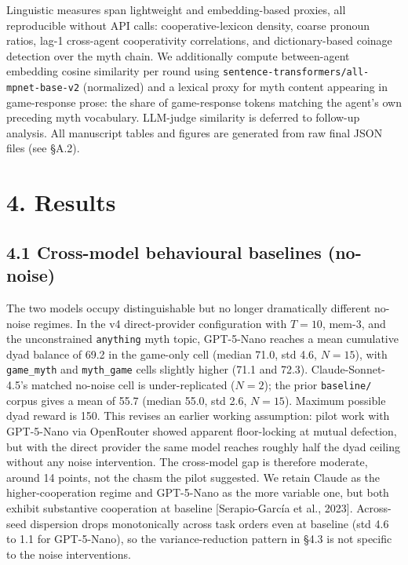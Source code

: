 \documentclass[
  10pt,
  letterpaper,
]{article}
\begin{document}
Linguistic measures span lightweight and embedding-based proxies, all
reproducible without API calls: cooperative-lexicon density, coarse
pronoun ratios, lag-1 cross-agent cooperativity correlations, and
dictionary-based coinage detection over the myth chain. We additionally
compute between-agent embedding cosine similarity per round using
\texttt{sentence-transformers/all-mpnet-base-v2} (normalized) and a
lexical proxy for myth content appearing in game-response prose: the
share of game-response tokens matching the agent's own preceding myth
vocabulary. LLM-judge similarity is deferred to follow-up analysis. All
manuscript tables and figures are generated from raw final JSON files
(see §A.2).

\section{4. Results}\label{results}

\subsection{4.1 Cross-model behavioural baselines
(no-noise)}\label{cross-model-behavioural-baselines-no-noise}

The two models occupy distinguishable but no longer dramatically
different no-noise regimes. In the v4 direct-provider configuration with
\(T = 10\), mem-3, and the unconstrained \texttt{anything} myth topic,
GPT-5-Nano reaches a mean cumulative dyad balance of 69.2 in the
game-only cell (median 71.0, std 4.6, \(N=15\)), with
\texttt{game\_myth} and \texttt{myth\_game} cells slightly higher (71.1
and 72.3). Claude-Sonnet-4.5's matched no-noise cell is under-replicated
(\(N = 2\)); the prior \texttt{baseline/} corpus gives a mean of 55.7
(median 55.0, std 2.6, \(N = 15\)). Maximum possible dyad reward is 150.
This revises an earlier working assumption: pilot work with GPT-5-Nano
via OpenRouter showed apparent floor-locking at mutual defection, but
with the direct provider the same model reaches roughly half the dyad
ceiling without any noise intervention. The cross-model gap is therefore
moderate, around 14 points, not the chasm the pilot suggested. We retain
Claude as the higher-cooperation regime and GPT-5-Nano as the more
variable one, but both exhibit substantive cooperation at baseline
{[}Serapio-García et al., 2023{]}. Across-seed dispersion drops
monotonically across task orders even at baseline (std 4.6 to 1.1 for
GPT-5-Nano), so the variance-reduction pattern in §4.3 is not specific
to the noise interventions.
\end{document}
